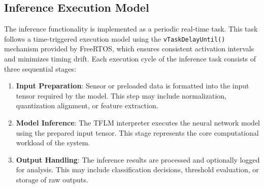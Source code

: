 \documentclass[conference]{IEEEtran}
\begin{document}
\subsection{Inference Execution Model}

The inference functionality is implemented as a periodic real-time task. This task follows a time-triggered execution model using the \texttt{vTaskDelayUntil()} mechanism provided by FreeRTOS, which ensures consistent activation intervals and minimizes timing drift. 
Each execution cycle of the inference task consists of three sequential stages: 
\begin{enumerate}
    \item \textbf{Input Preparation}: Sensor or preloaded data is formatted into the input tensor required by the model. This step may include normalization, quantization alignment, or feature extraction.
    
    \item \textbf{Model Inference}: The TFLM interpreter executes the neural network model using the prepared input tensor. This stage represents the core computational workload of the system.
    
    \item \textbf{Output Handling}: The inference results are processed and optionally logged for analysis. This may include classification decisions, threshold evaluation, or storage of raw outputs.
\end{enumerate}
\end{document}
